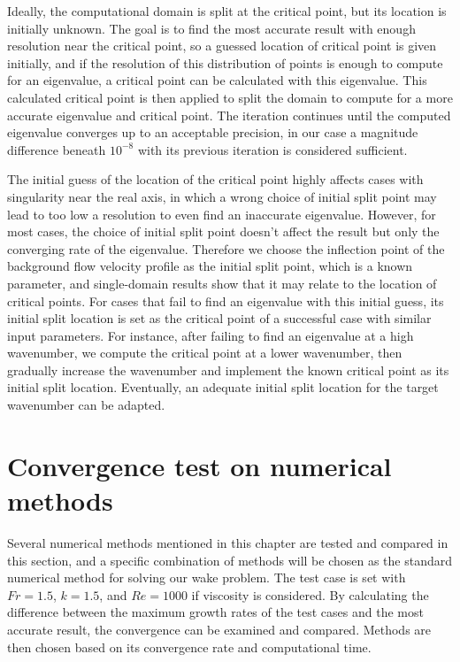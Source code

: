 Ideally, the computational domain is split at the critical point, but its location is initially unknown. The goal is to find the most accurate result with enough resolution near the critical point, so a guessed location of critical point is given initially, and if the resolution of this distribution of points is enough to compute for an eigenvalue, a critical point can be calculated with this eigenvalue. This calculated critical point is then applied to split the domain to compute for a more accurate eigenvalue and critical point. The iteration continues until the computed eigenvalue converges up to an acceptable precision, in our case a magnitude difference beneath $10^{-8}$ with its previous iteration is considered sufficient.

The initial guess of the location of the critical point highly affects cases with singularity near the real axis, in which a wrong choice of initial split point may lead to too low a resolution to even find an inaccurate eigenvalue. However, for most cases, the choice of initial split point doesn't affect the result but only the converging rate of the eigenvalue. Therefore we choose the inflection point of the background flow velocity profile as the initial split point, which is a known parameter, and single-domain results show that it may relate to the location of critical points. For cases that fail to find an eigenvalue with this initial guess, its initial split location is set as the critical point of a successful case with similar input parameters. For instance, after failing to find an eigenvalue at a high wavenumber, we compute the critical point at a lower wavenumber, then gradually increase the wavenumber and implement the known critical point as its initial split location. Eventually, an adequate initial split location for the target wavenumber can be adapted.%

\section{Convergence test on numerical methods} \label{nmtest}
Several numerical methods mentioned in this chapter are tested and compared in this section, and a specific combination of methods will be chosen as the standard numerical method for solving our wake problem. The test case is set with $Fr=1.5$, $k=1.5$, and $Re=1000$ if viscosity is considered. By calculating the difference between the maximum growth rates of the test cases and the most accurate result, the convergence can be examined and compared. Methods are then chosen based on its convergence rate and computational time.

